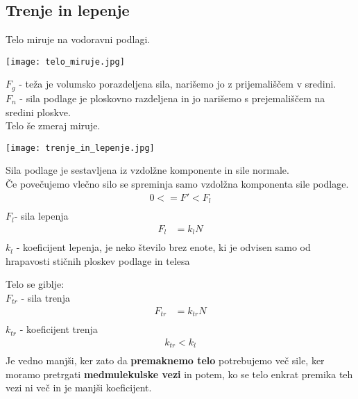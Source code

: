 {\color{indiagreen}\subsection{Trenje in lepenje}}
Telo miruje na vodoravni podlagi.\\
\begin{center}
	\texttt{[image: telo\_miruje.jpg]}
\end{center}
\textbf{$F_g$} - teža je volumsko porazdeljena sila, narišemo jo z prijemališčem v sredini.\\
\textbf{$F_n$} - sila podlage je ploskovno razdeljena in jo narišemo s prejemališčem na sredini ploskve.\\
Telo še zmeraj miruje.
\begin{center}
	\texttt{[image: trenje\_in\_lepenje.jpg]}
\end{center}
Sila podlage je sestavljena iz vzdolžne komponente in sile normale. \\
Če povečujemo vlečno silo se spreminja samo vzdolžna komponenta sile podlage.
\begin{align*}
	0 <= F' < F_l\\
\end{align*}
\textbf{$F_l$}- sila lepenja\\
\begin{align*}
	F_l &= k_lN\\
\end{align*}
\textbf{$k_l$} - koeficijent lepenja, je neko število brez enote, ki je odvisen samo od hrapavosti stičnih ploskev podlage in telesa\\

Telo se giblje:\\
\textbf{$F_{tr}$} - sila trenja
\begin{align*}
	F_{tr} &= k_{tr}N\\
\end{align*}
\textbf{$k_{tr}$} - koeficijent trenja
\begin{align*}
	k_{tr} < k_l\\
\end{align*}
Je vedno manjši, ker zato da \textbf{premaknemo telo} potrebujemo več sile, ker moramo pretrgati \textbf{medmulekulske vezi} in potem, ko se telo enkrat premika teh vezi ni več in je manjši koeficijent.\\